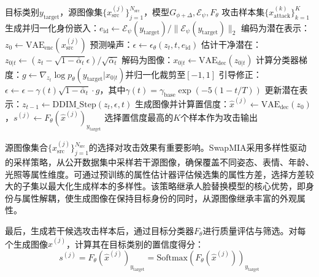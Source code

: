 \begin{algorithm}[!t]
  \caption{基于分类器引导的MIA推理（Classifier-Guided MIA Inference）}
  \label{alg:mia_inference}
  \begin{algorithmic}[1]
    \REQUIRE 目标类别$y_{\text{target}}$，源图像集$\{x_{\text{src}}^{(j)}\}_{j=1}^{N_{\text{src}}}$，模型$G_{\phi+\Delta}, \mathcal{E}_\psi, F_\theta$
    \ENSURE 攻击样本集$\{x_{\text{attack}}^{(k)}\}_{k=1}^{K}$
    \STATE 生成并归一化身份嵌入：$e_{\text{id}} \leftarrow \mathcal{E}_\psi(y_{\text{target}}) / \|\mathcal{E}_\psi(y_{\text{target}})\|_2$
    \STATE 编码为潜在表示：$z_0 \leftarrow \text{VAE}_{\text{enc}}(x_{\text{src}}^{(j)})$
    \STATE 预测噪声：$\epsilon \leftarrow \epsilon_\theta(z_t, t, e_{\text{id}})$
    \STATE 估计干净潜在：$z_{0|t} \leftarrow (z_t - \sqrt{1-\bar{\alpha}_t}\epsilon) / \sqrt{\bar{\alpha}_t}$
    \STATE 解码为图像：$x_{0|t} \leftarrow \text{VAE}_{\text{dec}}(z_{0|t})$
    \STATE 计算分类器梯度：$g \leftarrow \nabla_{z_t} \log p_\theta(y_{\text{target}}|x_{0|t})$并归一化裁剪至$[-1,1]$
    \STATE 引导修正：$\epsilon \leftarrow \epsilon - \gamma(t) \sqrt{1-\bar{\alpha}_t} \cdot g$，其中$\gamma(t) = \gamma_{\text{base}} \exp(-5(1-t/T))$
    \ENDIF
    \STATE 更新潜在表示：$z_{t-1} \leftarrow \text{DDIM\_Step}(z_t, \epsilon, t)$
    \ENDFOR
    \STATE 生成图像并计算置信度：$\hat{x}^{(j)} \leftarrow \text{VAE}_{\text{dec}}(z_0)$，$s^{(j)} \leftarrow F_\theta(\hat{x}^{(j)})_{y_{\text{target}}}$
    \ENDFOR
    \RETURN 选择置信度最高的$K$个样本作为攻击输出
  \end{algorithmic}
\end{algorithm}

源图像集合$\{x_{\text{src}}^{(j)}\}_{j=1}^{N_{\text{src}}}$的选择对攻击效果有重要影响。SwapMIA采用多样性驱动的采样策略，从公开数据集中采样若干源图像，确保覆盖不同姿态、表情、年龄、光照等属性维度。可通过预训练的属性估计器评估候选集的属性方差，选择方差较大的子集以最大化生成样本的多样性。该策略继承人脸替换模型的核心优势，即身份与属性解耦，使生成图像在保持目标身份的同时，从源图像继承丰富的外观属性。

最后，生成若干候选攻击样本后，通过目标分类器$F_\theta$进行质量评估与筛选。对每个生成图像$\hat{x}^{(j)}$，计算其在目标类别的置信度得分：
\begin{equation}\label{eq:mia_inference_confidence}
    s^{(j)} = F_\theta(\hat{x}^{(j)})_{y_{\text{target}}} = \text{Softmax}(F_\theta(\hat{x}^{(j)}))_{y_{\text{target}}}
\end{equation}

